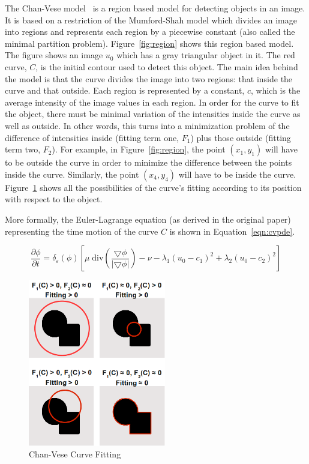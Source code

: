 \documentclass[10pt,twocolumn,letterpaper]{article}
\begin{document}
The Chan-Vese model~\cite{chan2001active} is a region based model for detecting objects in an image. It is based on a restriction of the Mumford-Shah model
which divides an image into
regions and represents each region by a piecewise constant (also called the minimal partition problem). Figure~\ref{fig:region} shows this region based model.
The figure shows an image $u_{0}$ which has a gray triangular object in it. The red curve, $C$, is the initial contour used to detect this object. The
main idea behind the model is that the curve divides the image into two regions: that inside the curve and that outside. Each region is represented by a
constant, $c$, which is the average intensity of the image values in each region. In order for the curve to fit the object, there must be minimal variation of
the
intensities inside the curve as well as outside. In other words, this turns into a minimization problem of the difference of intensities inside (fitting term
one, $F_{1}$) plus those
outside (fitting term two, $F_{2}$). For example, in Figure~\ref{fig:region}, the point $(x_{1},y_{1})$ will have to be outside the curve in order to minimize
the difference
between the points inside
the curve. Similarly, the point $(x_{4}, y_{4})$ will have to be inside the curve. Figure~\ref{fig:fitting} shows all the possibilities of the curve's fitting
according to its position with respect to the object.

More formally, the Euler-Lagrange equation (as derived in the original paper) representing the time motion of the curve $C$ is shown in
Equation~\ref{eqn:cvpde}.

\begin{equation}
\label{eqn:cvpde}
\frac{\partial{\phi}}{\partial{t}} = \delta_{\varepsilon}(\phi)[\mu\; \mathrm{div}(\frac{\bigtriangledown \phi}{|\bigtriangledown \phi|}) - \nu -
\lambda_{1}(u_{0} - c_{1})^2 +\lambda_{2}(u_{0} - c_{2})^2] 
\end{equation}

\begin{figure}[t!]
\centering
\includegraphics[width=6cm]{fitting.png}
\caption{Chan-Vese Curve Fitting}
\label{fig:fitting}
\end{figure}
\end{document}
